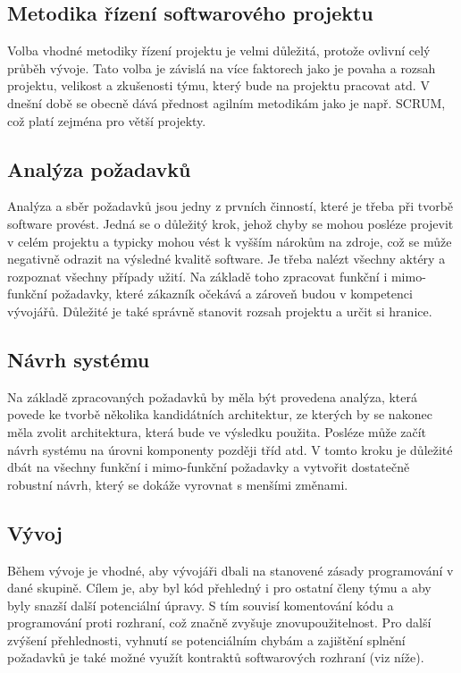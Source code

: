 	\subsection{Metodika řízení softwarového projektu}
		Volba vhodné metodiky řízení projektu je velmi důležitá, protože ovlivní celý průběh vývoje. Tato volba je závislá na více faktorech jako je povaha a rozsah projektu, velikost a zkušenosti týmu, který bude na projektu pracovat atd. V dnešní době se obecně dává přednost agilním metodikám jako je např. SCRUM, což platí zejména pro větší projekty.
	
	\subsection{Analýza požadavků}
		Analýza a sběr požadavků jsou jedny z prvních činností, které je třeba při tvorbě software provést. Jedná se o důležitý krok, jehož chyby se mohou posléze projevit v celém projektu a typicky mohou vést k vyšším nárokům na zdroje, což se může negativně odrazit na výsledné kvalitě software. Je třeba nalézt všechny aktéry a rozpoznat všechny případy užití. Na základě toho zpracovat funkční i mimo-funkční požadavky, které zákazník očekává a zároveň budou v kompetenci vývojářů. Důležité je také správně stanovit rozsah projektu a určit si hranice. 

	\subsection{Návrh systému}
		Na základě zpracovaných požadavků by měla být provedena analýza, která povede ke tvorbě několika kandidátních architektur, ze kterých by se nakonec měla zvolit architektura, která bude ve výsledku použita. Posléze může začít návrh systému na úrovni komponenty později tříd atd. V tomto kroku je důležité dbát na všechny funkční i mimo-funkční požadavky a vytvořit dostatečně robustní návrh, který se dokáže vyrovnat s menšími změnami.
		
	\subsection{Vývoj}
		Během vývoje je vhodné, aby vývojáři dbali na stanovené zásady programování v dané skupině. Cílem je, aby byl kód přehledný i pro ostatní členy týmu a aby byly snazší další potenciální úpravy. S tím souvisí komentování kódu a programování proti rozhraní, což značně zvyšuje znovupoužitelnost. Pro další zvýšení přehlednosti, vyhnutí se potenciálním chybám a zajištění splnění požadavků je také možné využít kontraktů softwarových rozhraní (viz níže).
	
